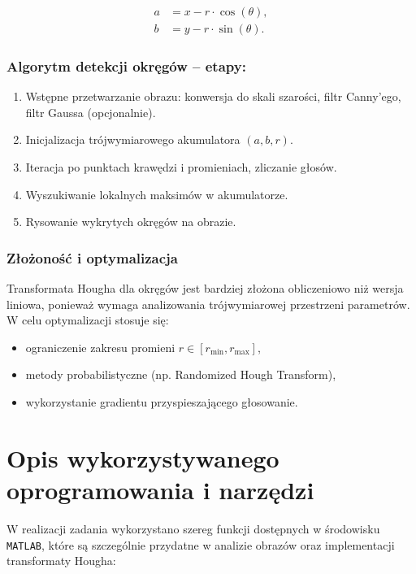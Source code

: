 \begin{align}
	a &= x - r \cdot \cos(\theta), \\
	b &= y - r \cdot \sin(\theta).
\end{align}

\subsubsection*{Algorytm detekcji okręgów – etapy:}
\begin{enumerate}
	\item Wstępne przetwarzanie obrazu: konwersja do skali szarości, filtr Canny’ego, filtr Gaussa (opcjonalnie).
	\item Inicjalizacja trójwymiarowego akumulatora $(a, b, r)$.
	\item Iteracja po punktach krawędzi i promieniach, zliczanie głosów.
	\item Wyszukiwanie lokalnych maksimów w akumulatorze.
	\item Rysowanie wykrytych okręgów na obrazie.
\end{enumerate}

\subsubsection*{Złożoność i optymalizacja}
Transformata Hougha dla okręgów jest bardziej złożona obliczeniowo niż wersja liniowa, ponieważ wymaga analizowania trójwymiarowej przestrzeni parametrów. W celu optymalizacji stosuje się:
\begin{itemize}
	\item ograniczenie zakresu promieni $r \in [r_{\text{min}}, r_{\text{max}}]$,
	\item metody probabilistyczne (np. Randomized Hough Transform),
	\item wykorzystanie gradientu przyspieszającego głosowanie.
\end{itemize}


\section{Opis wykorzystywanego oprogramowania i narzędzi}

W realizacji zadania wykorzystano szereg funkcji dostępnych w środowisku \texttt{MATLAB}, które są szczególnie przydatne w analizie obrazów oraz implementacji transformaty Hougha:


